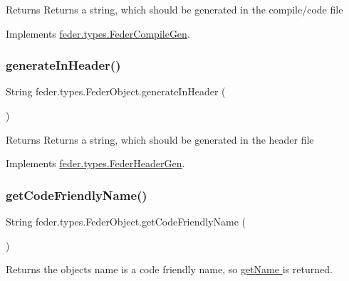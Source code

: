 \begin{DoxyReturn}{Returns}
Returns a string, which should be generated in the compile/code file 
\end{DoxyReturn}


Implements \hyperlink{interfacefeder_1_1types_1_1FederCompileGen}{feder.\+types.\+Feder\+Compile\+Gen}.

\mbox{\label{classfeder_1_1types_1_1FederObject_a4e813a7bd196036c8754ef35bcffbfef}} 
\subsubsection{\texorpdfstring{generate\+In\+Header()}{generateInHeader()}}
{\footnotesize\ttfamily String feder.\+types.\+Feder\+Object.\+generate\+In\+Header (\begin{DoxyParamCaption}{ }\end{DoxyParamCaption})}

\begin{DoxyReturn}{Returns}
Returns a string, which should be generated in the header file 
\end{DoxyReturn}


Implements \hyperlink{interfacefeder_1_1types_1_1FederHeaderGen}{feder.\+types.\+Feder\+Header\+Gen}.

\mbox{\label{classfeder_1_1types_1_1FederObject_ab606323254677bef8b0b1afe1377e073}} 
\subsubsection{\texorpdfstring{get\+Code\+Friendly\+Name()}{getCodeFriendlyName()}}
{\footnotesize\ttfamily String feder.\+types.\+Feder\+Object.\+get\+Code\+Friendly\+Name (\begin{DoxyParamCaption}{ }\end{DoxyParamCaption})}

\begin{DoxyReturn}{Returns}
the object\textquotesingle{}s name is a code friendly name, so \hyperlink{classfeder_1_1types_1_1FederObject_afced6ab112045e9757c40bd06ac6413c}{get\+Name } is returned. 
\end{DoxyReturn}
\mbox{\label{classfeder_1_1types_1_1FederObject_afced6ab112045e9757c40bd06ac6413c}} 
